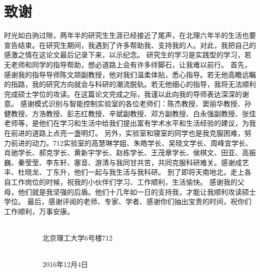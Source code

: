 
\chapter*{致谢}
时光如白驹过隙，两年半的研究生生涯已经接近了尾声，在北理六年半的生活也要宣告结束。在研究生期间，我遇到了许多帮助我、支持我的人。对此，我把自己的感激之情在这论文最后记录下来，以示纪念。
研究生的学习是实践型的学习，若无老师和同学的指导帮助，想必道路上会有许多绊脚石，让我难以前行。
首先，感谢我的指导导师陈文颉副教授，他对我们温柔体贴，悉心指导。若无他高瞻远瞩的指路，我的研究方向就会与科研的潮流脱轨。若无他细心的指导，我将无法顺利完成硕士学位的攻读。在这篇论文完成之际，我谨以此向我的导师表达深深的谢意。
感谢模式识别与智能控制实验室的各位老师们：陈杰教授、窦丽华教授、孙健教授、方浩教授、彭志红教授、辛斌副教授、邓方副教授、白永强副教授、张佳老师等，是他们在学习和生活中给我们提出富有学术水平和生活经验的建议，为我在前进的道路上点亮一盏明灯。
另外，实验室和寝室的同学也是我克服困难，努力前进的动力。712实验室的高慧琳学姐、朱皓学长、吴晓文学长、周峰宜学长、肖驰学长、郝克学长、黄新宇学长、赵栋学长、王茂章学长、侯棋文、田亚、高振巍、秦莹莹、李东轩、塞音、游清与我同甘共苦，共同克服科研难关。感谢成艺丰、杜晓龙、丁东升，他们一起与我生活与我科研。
到了即将天南地北，走上各自工作岗位的时候，祝我的小伙伴们学习、工作顺利，生活愉快。
感谢我的父母，他们就是我坚强的后盾。他们十几年如一日的支持我，才能让我顺利攻读硕士学位。
最后，感谢评阅的老师、专家、学者、感谢你们抽出宝贵的时间，祝你们工作顺利，万事安康。

\ \ \ \ \ \ \ \ \ \ \ \ \ \ \ \ \ \ \ \  \ \ \ \ \ \ \ \ \ \ \ \ \ \ \ \ \ \ \ \   \ \ \ \ \ \ \ \ \ \ \ \ \ \ \ \ \ \ \ \ \ \ \ \ \ \ \ \ \ \ \  \ \ \ \ \ \ \ \ \ \  \ \ 北京理工大学6号楼712

\ \ \ \ \ \ \ \ \ \ \ \ \ \ \ \ \ \ \ \  \ \ \ \ \ \ \ \ \ \  \ \ \ \ \ \ \ \ \ \  \ \ \ \ \ \ \ \ \ \ \ \ \ \ \ \ \ \ \ \  \ \ \ \ \ \ \ \ \ \  \ \ \ \  \ \ \   \ \ \ \ \ \ 2016年12月4日

